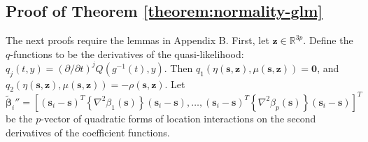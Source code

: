 \documentclass[authoryear,review, 12pt]{elsarticle}
\begin{document}
\subsection*{Proof of Theorem \ref{theorem:normality-glm}}
The next proofs require the lemmas in Appendix B. First, let $\bm{z}\in\mathbb{R}^{3p}$.
Define the $q$-functions to be the derivatives of the quasi-likelihood:
$q_{j}(t,y)=\left(\partial/\partial t\right)^{j}Q\left(g^{-1}(t),y\right)$.
Then $q_{1}\left(\eta\left(\bm{s},\bm{z}\right),\mu\left(\bm{s},\bm{z}\right)\right)=\bm{0}$,
and $q_{2}\left(\eta\left(\bm{s},\bm{z}\right),\mu\left(\bm{s},\bm{z}\right)\right)=-\rho\left(\bm{s},\bm{z}\right)$.
Let $\tilde{\bm{\beta}}_{i}''=\left[\left(\bm{s}_{i}-\bm{s}\right)^{T}\left\{ \nabla^{2}\beta_{1}(\bm{s})\right\} \left(\bm{s}_{i}-\bm{s}\right),\dots,\left(\bm{s}_{i}-\bm{s}\right)^{T}\left\{ \nabla^{2}\beta_{p}(\bm{s})\right\} \left(\bm{s}_{i}-\bm{s}\right)\right]^{T}$
be the $p$-vector of quadratic forms of location interactions on
the second derivatives of the coefficient functions.
\end{document}
